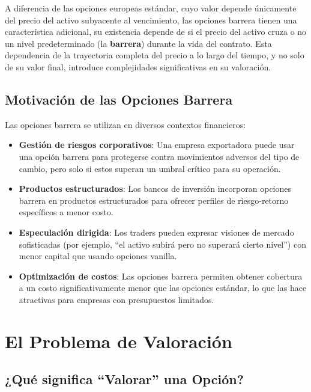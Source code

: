A diferencia de las opciones europeas estándar, cuyo valor depende únicamente del precio del activo subyacente al vencimiento, las opciones barrera tienen una característica adicional, su existencia depende de si el precio del activo cruza o no un nivel predeterminado (la \textbf{barrera}) durante la vida del contrato. Esta dependencia de la trayectoria completa del precio a lo largo del tiempo, y no solo de su valor final, introduce complejidades significativas en su valoración.

\subsection{Motivación de las Opciones Barrera}

Las opciones barrera se utilizan en diversos contextos financieros:

\begin{itemize}
    \item \textbf{Gestión de riesgos corporativos}: Una empresa exportadora puede usar una opción barrera para protegerse contra movimientos adversos del tipo de cambio, pero solo si estos superan un umbral crítico para su operación.
    
    \item \textbf{Productos estructurados}: Los bancos de inversión incorporan opciones barrera en productos estructurados para ofrecer perfiles de riesgo-retorno específicos a menor costo.
    
    \item \textbf{Especulación dirigida}: Los traders pueden expresar visiones de mercado sofisticadas (por ejemplo, ``el activo subirá pero no superará cierto nivel'') con menor capital que usando opciones vanilla.
    
    \item \textbf{Optimización de costos}: Las opciones barrera permiten obtener cobertura a un costo significativamente menor que las opciones estándar, lo que las hace atractivas para empresas con presupuestos limitados.
\end{itemize}

\section{El Problema de Valoración}

\subsection{¿Qué significa ``Valorar'' una Opción?}

